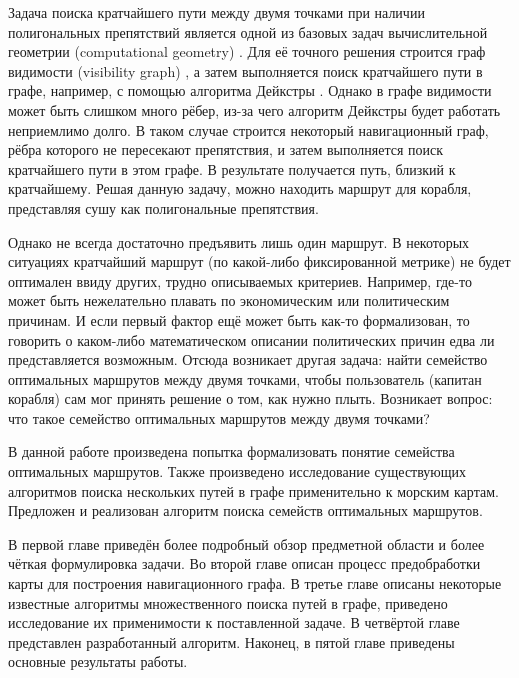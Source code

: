 \startprefacepage

Задача поиска кратчайшего пути между двумя точками при наличии
полигональных препятствий является одной из базовых задач
вычислительной геометрии (computational
geometry) \cite{PrSh}. Для её точного решения строится граф
видимости (visibility graph) \cite{deBerg}, а затем выполняется поиск
кратчайшего пути в графе, например, с помощью алгоритма Дейкстры
\cite{Cormen}. Однако в графе видимости может быть слишком много
рёбер, из-за чего алгоритм Дейкстры будет работать неприемлимо долго.
В таком случае строится некоторый навигационный граф, рёбра которого
не пересекают препятствия, и затем выполняется поиск кратчайшего пути
в этом графе. В результате получается путь, близкий к кратчайшему.
Решая данную задачу, можно находить маршрут для корабля, представляя
сушу как полигональные препятствия. 

Однако не всегда достаточно предъявить лишь один маршрут. В некоторых
ситуациях кратчайший маршрут (по какой-либо фиксированной метрике) не
будет оптимален ввиду других, трудно описываемых критериев. Например,
где-то может быть нежелательно плавать по экономическим или
политическим причинам. И если первый фактор ещё может быть как-то
формализован, то говорить о каком-либо математическом
описании политических причин едва ли представляется возможным. Отсюда
возникает другая задача: найти семейство оптимальных маршрутов между
двумя точками, чтобы пользователь (капитан корабля) сам мог принять
решение о том, как нужно плыть. Возникает вопрос: что такое семейство
оптимальных маршрутов между двумя точками?

В данной работе произведена попытка формализовать понятие семейства
оптимальных маршрутов. Также произведено исследование существующих
алгоритмов поиска нескольких путей в графе применительно к морским
картам. Предложен и реализован алгоритм поиска семейств оптимальных маршрутов.

В первой главе приведён более подробный обзор предметной области и
более чёткая формулировка задачи. Во второй главе описан процесс
предобработки карты для построения навигационного графа. В третье
главе описаны некоторые известные алгоритмы множественного поиска
путей в графе, приведено исследование их применимости к поставленной
задаче. В четвёртой главе представлен разработанный алгоритм. Наконец,
в пятой главе приведены основные результаты работы.

\FloatBarrier

